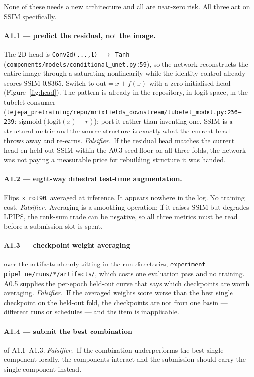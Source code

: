 \documentclass[11pt,a4paper]{article}
\newcommand{\fals}{\textit{Falsifier.}\ }
\begin{document}
None of these needs a new architecture and all are near-zero risk. All three act on SSIM specifically.

\paragraph{A1.1 --- predict the residual, not the image.} The 2D head is
\texttt{Conv2d(...,1) $\to$ Tanh} (\texttt{components/models/conditional\_unet.py:59}), so the network
reconstructs the entire image through a saturating nonlinearity while the identity control already scores
SSIM \num{0.8365}. Switch to $\mathrm{out} = x + f(x)$ with a zero-initialised head
(Figure~\ref{fig:head}). The pattern is already in the repository, in logit space, in the tubelet
consumer (\texttt{lejepa\_pretraining/\allowbreak repo/\allowbreak mrixfields\_downstream/\allowbreak tubelet\_model.py:236--239}:
$\mathrm{sigmoid}(\mathrm{logit}(x) + r)$); port it rather than inventing one. SSIM is a structural
metric and the source structure is exactly what the current head throws away and re-earns.
\fals If the residual head matches the current head on held-out SSIM within the A0.3 seed floor on all
three folds, the network was not paying a measurable price for rebuilding structure it was handed.

\paragraph{A1.2 --- eight-way dihedral test-time augmentation.} Flips $\times$ \texttt{rot90}, averaged
at inference. It appears nowhere in the log. No training cost.
\fals Averaging is a smoothing operation: if it raises SSIM but degrades LPIPS, the rank-sum trade can be
negative, so all three metrics must be read before a submission slot is spent.

\paragraph{A1.3 --- checkpoint weight averaging} over the artifacts already sitting in the run
directories, \texttt{experiment-pipeline/runs/*/artifacts/}, which costs one evaluation pass and no
training. A0.5 supplies the per-epoch held-out curve that says which checkpoints are worth averaging.
\fals If the averaged weights score worse than the best single checkpoint on the held-out fold, the
checkpoints are not from one basin --- different runs or schedules --- and the item is inapplicable.

\paragraph{A1.4 --- submit the best combination} of A1.1--A1.3.
\fals If the combination underperforms the best single component locally, the components interact and
the submission should carry the single component instead.
\end{document}
